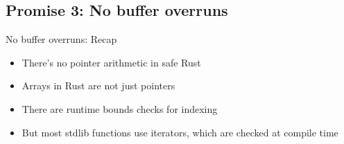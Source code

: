 \subsection{Promise 3: No buffer overruns}

\begin{frame}{No buffer overruns: Recap}
\begin{itemize}
	\item There's no pointer arithmetic in safe Rust
	\item Arrays in Rust are not just pointers
	\item There are runtime bounds checks for indexing
	\item But most stdlib functions use iterators, which are checked at
		compile time
\end{itemize}
\end{frame}
